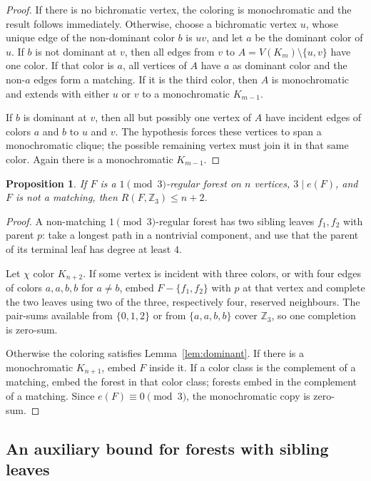 \documentclass[11pt]{article}
\newtheorem{proposition}[theorem]{Proposition}
\newcommand{\Z}{\mathbb Z}
\begin{document}
\begin{proof}
If there is no bichromatic vertex, the coloring is monochromatic and the result follows immediately. Otherwise, choose a bichromatic vertex $u$, whose unique edge of the non-dominant color $b$ is $uv$, and let $a$ be the dominant color of $u$.  If $b$ is not dominant at $v$, then all edges from $v$ to $A=V(K_m)\setminus\{u,v\}$ have one color.  If that color is $a$, all vertices of $A$ have $a$ as dominant color and the non-$a$ edges form a matching.  If it is the third color, then $A$ is monochromatic and extends with either $u$ or $v$ to a monochromatic $K_{m-1}$.

If $b$ is dominant at $v$, then all but possibly one vertex of $A$ have incident edges of colors $a$ and $b$ to $u$ and $v$.  The hypothesis forces these vertices to span a monochromatic clique; the possible remaining vertex must join it in that same color.  Again there is a monochromatic $K_{m-1}$.
\end{proof}

\begin{proposition}\label{prop:type2-upper}
If $F$ is a $1\pmod3$-regular forest on $n$ vertices, $3\mid e(F)$, and $F$ is not a matching, then $R(F,\Z_3)\le n+2$.
\end{proposition}

\begin{proof}
A non-matching $1\pmod3$-regular forest has two sibling leaves $f_1,f_2$ with parent $p$: take a longest path in a nontrivial component, and use that the parent of its terminal leaf has degree at least $4$.

Let $\chi$ color $K_{n+2}$.  If some vertex is incident with three colors, or with four edges of colors $a,a,b,b$ for $a\ne b$, embed $F-\{f_1,f_2\}$ with $p$ at that vertex and complete the two leaves using two of the three, respectively four, reserved neighbours.  The pair-sums available from $\{0,1,2\}$ or from $\{a,a,b,b\}$ cover $\Z_3$, so one completion is zero-sum.

Otherwise the coloring satisfies Lemma~\ref{lem:dominant}.  If there is a monochromatic $K_{n+1}$, embed $F$ inside it.  If a color class is the complement of a matching, embed the forest in that color class; forests embed in the complement of a matching.  Since $e(F)\equiv0\pmod3$, the monochromatic copy is zero-sum.
\end{proof}

\subsection{An auxiliary bound for forests with sibling leaves}
\end{document}
